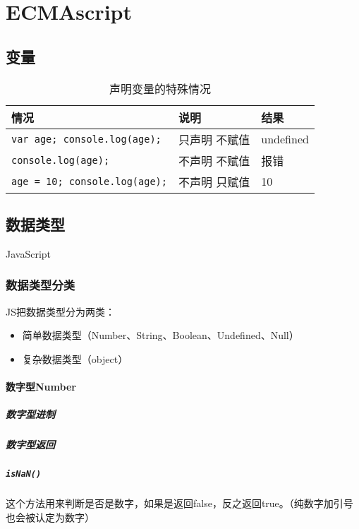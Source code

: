 \chapter{ECMAscript}
\section{变量}
\begin{table}
	\caption{声明变量的特殊情况}
	\centering
	\begin{tabular}{lll}
		\hline
		情况                                 & 说明      & 结果        \\
		\hline
		\verb|var age; console.log(age);|  & 只声明 不赋值 & undefined \\
		\verb|console.log(age);|           & 不声明 不赋值 & 报错        \\
		\verb|age = 10; console.log(age);| & 不声明 只赋值 & 10        \\
		\hline
	\end{tabular}
\end{table}
\section{数据类型}
JavaScript
\subsection{数据类型分类}
JS把数据类型分为两类：
\begin{itemize}
	\item 简单数据类型（Number、String、Boolean、Undefined、Null）
	\item 复杂数据类型（object）
\end{itemize}
\subsubsection{数字型Number}
\paragraph{数字型进制}
\paragraph{数字型返回}

\paragraph{\texttt{isNaN()}}
这个方法用来判断是否是数字，如果是返回false，反之返回true。（纯数字加引号也会被认定为数字）
